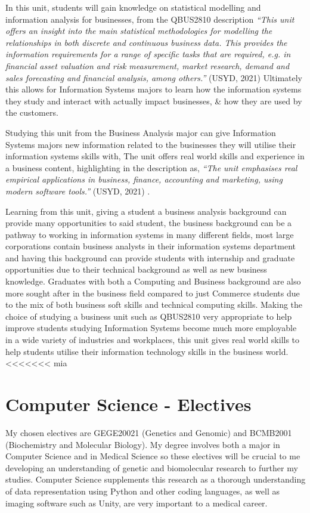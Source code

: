In this unit, students will gain knowledge on statistical modelling and information analysis for businesses, from the QBUS2810 description \textit{“This unit offers an insight into the main statistical methodologies for modelling the relationships in both discrete and continuous business data. This provides the information requirements for a range of specific tasks that are required, e.g. in financial asset valuation and risk measurement, market research, demand and sales forecasting and financial analysis, among others.”} (USYD, 2021) Ultimately this allows for Information Systems majors to learn how the information systems they study and interact with actually impact businesses, & how they are used by the customers.

Studying this unit from the Business Analysis major can give Information Systems majors new information related to the businesses they will utilise their information systems skills with, The unit offers real world skills and experience in a business content, highlighting in the description as, \textit{“The unit emphasises real empirical applications in business, finance, accounting and marketing, using modern software tools.”} (USYD, 2021) .

Learning from this unit, giving a student a business analysis background can provide many opportunities to said student, the business background  can be a pathway to working in information systems in many different fields, most large corporations contain business analysts in their information systems department and having this background can provide students with internship and graduate opportunities due to their technical background as well as new business knowledge. Graduates with both a Computing and Business background are also more sought after in the business field compared to just Commerce students due to the mix of both business soft skills and technical computing skills. Making the choice of studying a business unit such as QBUS2810 very appropriate to help improve students studying Information Systems become much more employable in a wide variety of industries and workplaces, this unit gives real world skills to help students utilise their information technology skills in the business world.<<<<<<< mia

\section{\textbf{Computer Science - Electives}}

My chosen electives are GEGE20021 (Genetics and Genomic) and BCMB2001 (Biochemistry and Molecular Biology). My degree involves both a major in Computer Science and in Medical Science so these electives will be crucial to me developing an understanding of genetic and biomolecular research to further my studies. Computer Science supplements this research as a thorough understanding of data representation using Python and other coding languages, as well as imaging software such as Unity, are very important to a medical career.


